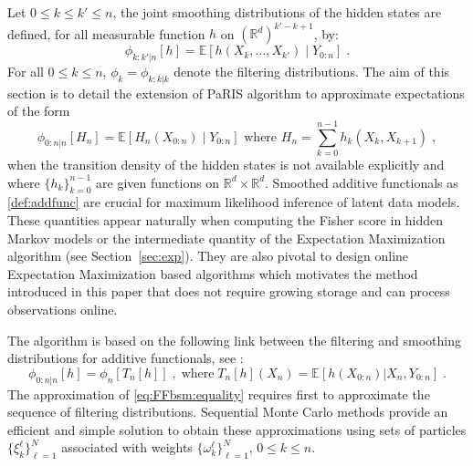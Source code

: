 \documentclass[12pt]{article}
\newcommand{\eqsp}{\;}
\newcommand{\1}{\mathrm{1}}
\newcommand{\E}{\mathbb{E}}
\begin{document}
Let $0 \leq k \leq k' \leq n$, the joint smoothing distributions of the hidden states are defined, for all measurable function $h$ on $(\mathbb{R}^d)^{k'-k + 1}$, by:
\[
\phi_{k:k'|n}[h] = \mathbb{E}\left[h(X_k,\ldots,X_{k'})\middle|Y_{0:n}\right]\eqsp.
\]
For all $0\le k\le n$, $\phi_{k} = \phi_{k:k|k}$ denote the filtering distributions. The aim of this section is to detail the extension of PaRIS algorithm to approximate expectations of the form
\begin{equation}
\label{def:addfunc}
\phi_{0:n\vert n}[H_{n}] = \mathbb{E}\left[H_n(X_{0:n})\middle|Y_{0:n}\right] \text{ where } H_n=\sum_{k=0}^{n-1}h_k(X_k,X_{k+1})\eqsp,
\end{equation}
when the transition density of the hidden states is not available explicitly and where $\{h_k\}_{k=0}^{n-1}$ are given functions on $\mathbb{R}^d\times \mathbb{R}^d$. 
Smoothed additive functionals as \eqref{def:addfunc} are crucial for maximum likelihood inference of latent data models. 
These quantities appear naturally when computing the Fisher score in hidden Markov models or the intermediate quantity of the Expectation Maximization algorithm (see Section~\ref{sec:exp}). 
They are also pivotal to design online Expectation Maximization based algorithms which motivates the method introduced in this paper that does not require growing storage and can process observations online.


The algorithm is based on the following link between the filtering and smoothing distributions for additive functionals, see \cite{olsson:westerborn:2016}:
\begin{equation}
\phi_{0:n|n}[h] = \phi_n[T_n[h]]\eqsp,\;\mbox{where}\; T_n[h](X_n) = \E\left[h(X_{0:n})\vert X_n,Y_{0:n}\right]\eqsp.\label{eq:FFbsm:equality}
\end{equation}
The approximation of \eqref{eq:FFbsm:equality} requires first to approximate the sequence of filtering distributions. 
Sequential Monte Carlo methods provide an efficient and simple solution to obtain these approximations using sets of particles $\{\xi^{\ell}_k\}_{\ell=1}^N$ associated with weights $\{\omega^{\ell}_k\}_{\ell=1}^N$, $0\le k \le n$.
\end{document}
